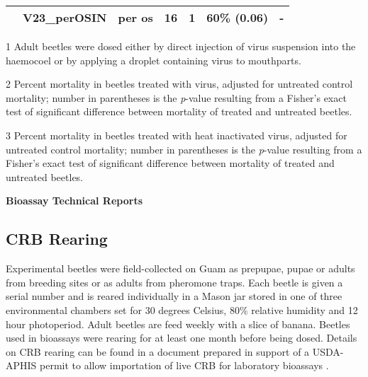 \documentclass[12pt,letterpaper,english,bibliography=totocnumbered]{scrartcl}
\begin{document}
\begin{refsection}
\begin{table}[h]
\begin{adjustbox}{width=\columnwidth,center}
\begin{threeparttable}
\begin{tabular}{ l l l c c c c }
		                      & V23\_perOSIN\cite{moore_bioassay_2019-1}        & per os          & 16      & 1          & 60\% (0.06)                     & -                               \\ \bottomrule
	\end{tabular}
	\begin{tablenotes}[para]
		\item[1] Adult beetles were dosed either by direct injection of virus suspension into the haemocoel or by applying a droplet containing virus to mouthparts. \\ 
		\item[2] Percent mortality in beetles treated with virus, adjusted for untreated control mortality; 
		number in parentheses is the \textit{p}-value resulting from a Fisher's exact test of significant difference between mortality of treated and untreated beetles. \\
		\item[3] Percent mortality in beetles treated with heat inactivated virus, adjusted for untreated control mortality; 
		number in parentheses is the \textit{p}-value resulting from a Fisher's exact test of significant difference between mortality of treated and untreated beetles. 
	\end{tablenotes}
	 		
\end{threeparttable}
	\end{adjustbox}
\end{table}
\clearpage

\textbf{Bioassay Technical Reports}

\printbibliography[heading=none]
\end{refsection}

\clearpage
\subsection{CRB Rearing}

Experimental beetles were field-collected on Guam as prepupae, pupae or adults from breeding sites or as adults from pheromone traps.  Each beetle is given a serial number and is reared individually in a Mason jar stored in one of three environmental chambers set for 30 degrees Celsius, 80\% relative humidity and 12 hour photoperiod. Adult beetles are feed weekly with a slice of banana. Beetles used in bioassays were rearing for at least one month before being dosed. Details on CRB rearing can be found in a document prepared in support of a USDA-APHIS permit to allow importation of live CRB for laboratory bioassays \cite{moore_additional_2019}.  
\end{document}
